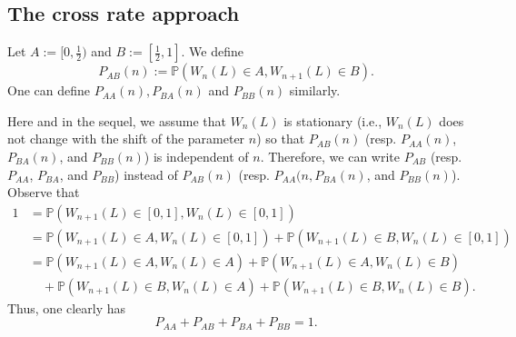 \documentclass[11pt]{article}
\numberwithin{equation}{section}
\begin{document}
\subsection{The cross rate approach}

Let $A:=[0,\frac{1}{2})$ and  $B:=[\frac{1}{2},1]$.  We define  
\begin{equation*}
P_{AB}(n):= \mathbb{P}(W_n(L)\in A,W_{n+1}(L)\in B).
\end{equation*}
 One can define $P_{AA}(n), P_{BA}(n) $ and $P_{BB}(n)$ similarly.
 
Here and in the sequel, we assume that $W_n(L)$ is stationary (i.e., $W_n(L)$ does not change with the shift of the parameter $n$)  so that $P_{AB}(n)$ (resp. $P_{AA}(n) $, $P_{BA}(n)$, and $P_{BB}(n)$)  is independent of $n$. Therefore, we can write $P_{AB}$ (resp.  $P_{AA} $, $P_{BA}$, and $P_{BB}$) instead of $P_{AB}(n)$ (resp.  $P_{AA}(n , P_{BA}(n)$, and $P_{BB}(n)$).  Observe that
  \begin{equation*}
\begin{split}  
1&=\mathbb{P}(W_{n+1}(L)\in [0,1], W_n(L)\in [0,1]) \\
&=\mathbb{P}(W_{n+1}(L)\in A, W_n(L)\in [0,1])+\mathbb{P}(W_{n+1}(L)\in B, W_n(L)\in [0,1])\\
&=\mathbb{P}(W_{n+1}(L)\in A, W_n(L)\in A)+\mathbb{P}(W_{n+1}(L)\in A, W_n(L)\in B)\\
&\quad+\mathbb{P}(W_{n+1}(L)\in B, W_n(L)\in A)+\mathbb{P}(W_{n+1}(L)\in B, W_n(L)\in B).
 \end{split}
 \end{equation*}
 Thus, one clearly has 
\begin{equation*}
P_{AA}+P_{AB}+P_{BA}+P_{BB}=1.
\end{equation*}
 
\end{document}
